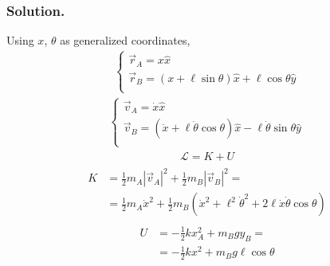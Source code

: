 \documentclass[letterpaper,10pt,english]{jupyterBook}
\begin{document}
\subsubsection*{Solution.}

\sphinxAtStartPar
{} Using \(x\), \(\theta\) as generalized coordinates,
\begin{equation*}
\begin{split}\begin{cases}
  \vec{r}_A = x \hat{x} \\
  \vec{r}_B = ( x + \ell \sin \theta ) \hat{x} + \ell \cos \theta \hat{y} \\
\end{cases}\end{split}
\end{equation*}\begin{equation*}
\begin{split}\begin{cases}
  \vec{v}_A = \dot{x} \hat{x} \\
  \vec{v}_B = ( \dot{x} + \ell \dot{\theta} \cos \theta ) \hat{x} - \ell \dot{\theta} \sin \theta \hat{y} \\
\end{cases}\end{split}
\end{equation*}
\sphinxAtStartPar
{}
\begin{equation*}
\begin{split}\mathscr{L} = K + U\end{split}
\end{equation*}\begin{equation*}
\begin{split}\begin{aligned}
  K & = \frac{1}{2} m_A |\vec{v}_A|^2 + \frac{1}{2} m_B |\vec{v}_B|^2 = \\
    & = \frac{1}{2} m_A \dot{x}^2 + \frac{1}{2} m_B \left( \dot{x}^2 + \ell^2 \dot{\theta}^2 + 2 \ell \dot{x} \dot{\theta} \cos \theta  \right) 
\end{aligned}\end{split}
\end{equation*}\begin{equation*}
\begin{split}\begin{aligned}
  U & = - \frac{1}{2} k x_A^2 + m_B g y_B = \\
    & = - \frac{1}{2} k x^2 + m_B g \ell \cos \theta  
\end{aligned}\end{split}
\end{equation*}
\end{document}
